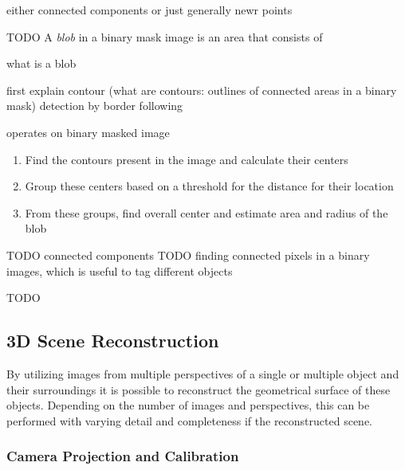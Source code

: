 either connected components or just generally newr points

TODO
A \emph{blob} in a binary mask image is an area that consists of 

what is a blob

first explain contour (what are contours: outlines of connected areas in a binary mask) detection by border following \autocite[][]{suzuki1985border}




\autocite[][]{opencv2018blob}
\autocite[][]{mallick2015blob}
operates on binary masked image
\begin{enumerate}
    \item Find the contours present in the image and calculate their centers
    \item Group these centers based on a threshold for the distance for their location
    \item From these groups, find overall center and estimate area and radius of the blob
\end{enumerate}

TODO connected components
TODO 
\autocite[][]{he2017connected}
finding connected pixels in a binary images, which is useful to tag different objects

TODO




\subsection{3D Scene Reconstruction}

By utilizing images from multiple perspectives of a single or multiple object and their surroundings
it is possible to reconstruct the geometrical surface of these objects.
Depending on the number of images and perspectives, this can be performed with varying detail and completeness if the reconstructed scene.

\subsubsection{Camera Projection and Calibration}

